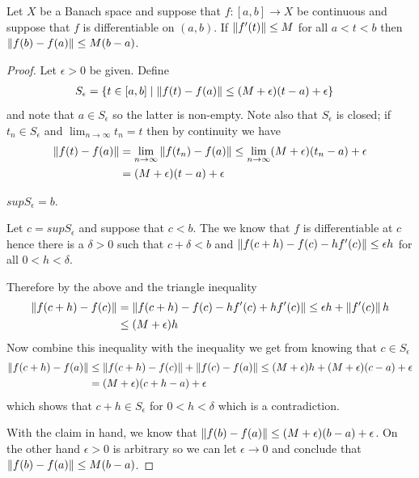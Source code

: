 \begin{prop}\label{banach:MeanValueInequality}Let
  $X$ be a Banach space and suppose that $f : [a,b] \to X$ be continuous and suppose that
  $f$ is differentiable on $(a,b)$.   If $\left \lVert f^\prime(t) \right \rVert \leq M$ for all $a < t < b$ then
  $\left \lVert f(b) - f(a) \right \rVert \leq M (b - a)$.   
\end{prop}
\begin{proof}
  Let $\epsilon > 0$ be given.   Define
  \begin{align*}
    S_\epsilon &= \lbrace t \in [a,b] \mid \left \lVert f(t) - f(a) \right \rVert \leq (M+\epsilon) (t -a) + \epsilon \rbrace
  \end{align*}
  and note that $a \in S_\epsilon$ so the latter is non-empty.   Note also that $S_\epsilon$ is closed; if $t_n \in S_\epsilon$ and
  $\lim_{n \to \infty} t_n = t$ then by continuity we have
  \begin{align*}
    \left \lVert f(t) - f(a) \right \rVert  &= \lim_{n \to \infty} \left \lVert f(t_n) - f(a) \right \rVert \le \lim_{n \to \infty} (M+\epsilon) (t_n -a) + \epsilon \\
    &= (M+\epsilon) (t -a) + \epsilon
  \end{align*}

  \begin{clm}$sup S_\epsilon = b$.
  \end{clm}
  Let $c = sup S_\epsilon$ and suppose that $c < b$.   The we know that $f$ is differentiable at $c$ hence there is a
  $\delta > 0$ such that $c + \delta < b$ and $\left \lVert f(c + h) - f(c) - h f^\prime(c) \right \rVert \leq \epsilon h$ for all $0 < h < \delta$.

  Therefore by the above and the triangle inequality 
  \begin{align*}
    \left \lVert f(c+h) - f(c) \right \rVert &=  \left \lVert f(c+h) - f(c) -h f^\prime(c) + h f^\prime(c) \right \rVert \leq \epsilon h +  \left \lVert f^\prime(c) \right \rVert h \\
    &\leq (M + \epsilon) h
  \end{align*}
  Now combine this inequality with the inequality we get from knowing that $c \in S_\epsilon$
  \begin{align*}
    \left \lVert f(c+h) - f(a) \right \rVert &\leq \left \lVert f(c+h) - f(c) \right \rVert + \left \lVert f(c) - f(a) \right \rVert \leq  (M + \epsilon) h + (M+\epsilon) (c-a) + \epsilon \\
    &=(M+\epsilon) (c + h -a) + \epsilon
  \end{align*}
  which shows that $c+h \in S_\epsilon$ for $0 < h < \delta$ which is a contradiction.

  With the claim in hand, we know that $\left \lVert f(b) - f(a) \right \rVert \leq (M+\epsilon) (b -a) + \epsilon$.   On the other hand $\epsilon > 0$ is arbitrary
  so we can let $\epsilon \to 0$ and conclude that $\left \lVert f(b) - f(a) \right \rVert \leq M (b -a)$.
\end{proof}

